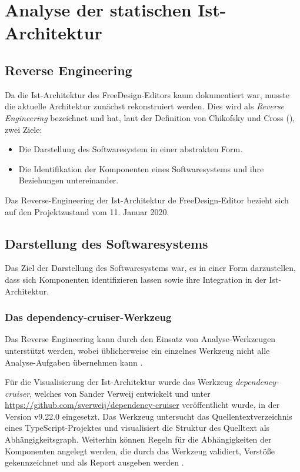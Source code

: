 \section{Analyse der statischen Ist-Architektur}

\subsection{Reverse Engineering}
Da die Ist-Architektur des FreeDesign-Editors kaum dokumentiert war, musste die aktuelle Architektur zunächst rekonstruiert werden. 
Dies wird als \emph{Reverse Engineering} bezeichnet und hat, laut der Definition von Chikofsky und Cross (\citeyear[S. 13-17]{Chikofsky1990}), zwei Ziele: 
\begin{itemize}
    \item Die Darstellung des Softwaresystem in einer abstrakten Form. 
    \item Die Identifikation der Komponenten eines Softwaresystems und ihre Beziehungen untereinander. 
\end{itemize}
Das Reverse-Engineering der Ist-Architektur de FreeDesign-Editor bezieht sich auf den Projektzustand vom 11. Januar 2020. 

\subsection{Darstellung des Softwaresystems}
Das Ziel der Darstellung des Softwaresystems war, es in einer Form darzustellen, dass sich Komponenten identifizieren lassen sowie ihre Integration in der Ist-Architektur. 

\subsubsection{Das {dependency-cruiser}-Werkzeug}
Das Reverse Engineering kann durch den Einsatz von Analyse-Werkzeugen unterstützt werden, wobei üblicherweise ein einzelnes Werkzeug nicht alle Analyse-Aufgaben übernehmen kann  \autocite[vgl.][381]{Bass2013}.  

Für die Visualisierung der Ist-Architektur wurde das Werkzeug \emph{dependency-cruiser}, welches von Sander Verweij entwickelt und unter \url{https://github.com/sverweij/dependency-cruiser} veröffentlicht wurde, in der Version v9.22.0 eingesetzt. 
Das Werkzeug untersucht das Quellentextverzeichnis eines TypeScript-Projektes und visualisiert die Struktur des Quelltext als Abhängigkeitsgraph. Weiterhin können Regeln für die Abhängigkeiten der Komponenten angelegt werden, die durch das Werkzeug validiert, Verstöße gekennzeichnet und als Report ausgeben werden \autocite[vgl.][]{Verweij:Dependency}. 

